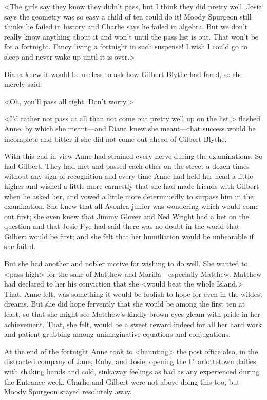 <The girls say they know they didn't pass, but I think they did pretty well. Josie says the geometry was so easy a child of ten could do it! Moody Spurgeon still thinks he failed in history and Charlie says he failed in algebra. But we don't really know anything about it and won't until the pass list is out. That won't be for a fortnight. Fancy living a fortnight in such suspense! I wish I could go to sleep and never wake up until it is over.>

Diana knew it would be useless to ask how Gilbert Blythe had fared, so she merely said:

<Oh, you'll pass all right. Don't worry.>

<I'd rather not pass at all than not come out pretty well up on the list,> flashed Anne, by which she meant—and Diana knew she meant—that success would be incomplete and bitter if she did not come out ahead of Gilbert Blythe.

With this end in view Anne had strained every nerve during the examinations. So had Gilbert. They had met and passed each other on the street a dozen times without any sign of recognition and every time Anne had held her head a little higher and wished a little more earnestly that she had made friends with Gilbert when he asked her, and vowed a little more determinedly to surpass him in the examination. She knew that all Avonlea junior was wondering which would come out first; she even knew that Jimmy Glover and Ned Wright had a bet on the question and that Josie Pye had said there was no doubt in the world that Gilbert would be first; and she felt that her humiliation would be unbearable if she failed.

But she had another and nobler motive for wishing to do well. She wanted to <pass high> for the sake of Matthew and Marilla—especially Matthew. Matthew had declared to her his conviction that she <would beat the whole Island.> That, Anne felt, was something it would be foolish to hope for even in the wildest dreams. But she did hope fervently that she would be among the first ten at least, so that she might see Matthew's kindly brown eyes gleam with pride in her achievement. That, she felt, would be a sweet reward indeed for all her hard work and patient grubbing among unimaginative equations and conjugations.

At the end of the fortnight Anne took to <haunting> the post office also, in the distracted company of Jane, Ruby, and Josie, opening the Charlottetown dailies with shaking hands and cold, sinkaway feelings as bad as any experienced during the Entrance week. Charlie and Gilbert were not above doing this too, but Moody Spurgeon stayed resolutely away.

